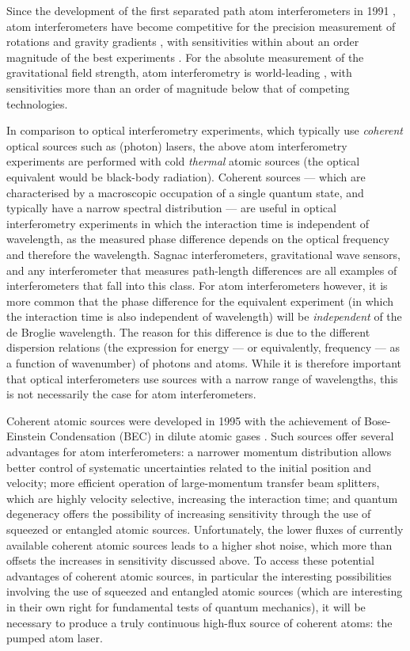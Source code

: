 Since the development of the first separated path atom interferometers in 1991 \citep{Carnal:1991,Keith:1991,Riehle:1991,Kasevich:1991}, atom interferometers have become competitive for the precision measurement of rotations \citep{McGuirk:2002} and gravity gradients \citep{Gustavson:2000}, with sensitivities within about an order magnitude of the best experiments \citep{Schreiber:2008,Moody:1993,Kann:1994}.  For the absolute measurement of the gravitational field strength, atom interferometry is world-leading \citep{Muller:2008}, with sensitivities more than an order of magnitude below that of competing technologies.

In comparison to optical interferometry experiments, which typically use \emph{coherent} optical sources such as (photon) lasers, the above atom interferometry experiments are performed with cold \emph{thermal} atomic sources (the optical equivalent would be black-body radiation).  Coherent sources --- which are characterised by a macroscopic occupation of a single quantum state, and typically have a narrow spectral distribution --- are useful in optical interferometry experiments in which the interaction time is independent of wavelength, as the measured phase difference depends on the optical frequency and therefore the wavelength.  Sagnac interferometers, gravitational wave sensors, and any interferometer that measures path-length differences are all examples of interferometers that fall into this class.  For atom interferometers however, it is more common that the phase difference for the equivalent experiment (in which the interaction time is also independent of wavelength) will be \emph{independent} of the de Broglie wavelength.  The reason for this difference is due to the different dispersion relations (the expression for energy --- or equivalently, frequency --- as a function of wavenumber) of photons and atoms.  While it is therefore important that optical interferometers use sources with a narrow range of wavelengths, this is not necessarily the case for atom interferometers.

Coherent atomic sources were developed in 1995 with the achievement of Bose-Einstein Condensation (BEC) in dilute atomic gases \citep{Anderson:1995vn,Bradley:1995ys,Davis:1995}.  Such sources offer several advantages for atom interferometers: a narrower momentum distribution allows better control of systematic uncertainties related to the initial position and velocity; more efficient operation of large-momentum transfer beam splitters, which are highly velocity selective, increasing the interaction time; and quantum degeneracy offers the possibility of increasing sensitivity through the use of squeezed or entangled atomic sources.  Unfortunately, the lower fluxes of currently available coherent atomic sources leads to a higher shot noise, which more than offsets the increases in sensitivity discussed above.  To access these potential advantages of coherent atomic sources, in particular the interesting possibilities involving the use of squeezed and entangled atomic sources (which are interesting in their own right for fundamental tests of quantum mechanics), it will be necessary to produce a truly continuous high-flux source of coherent atoms: the pumped atom laser.  

